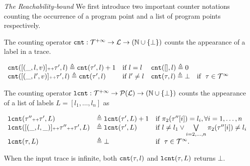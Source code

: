 \emph{The Reachability-bound}
We first introduce two important counter notations counting the occurrence of a program point and a list of program points respectively.
\begin{defn}
 \label{def:counter}
The counting operator $\mathtt{cnt} : \mathcal{T}^{+\infty} \to \mathcal{L} \to (\mathbb{N} \cup \{\bot\})$
counts the appearance of a label in a trace.
\begin{center}
{\small
$
\begin{array}{llll}
\mathtt{cnt}([(\_, l, v)] {\scriptscriptstyle ++} \mathtt{\tau}', l ) \triangleq \mathtt{cnt}(\mathtt{\tau}', l) + 1 & \text{if}~ l = l
&
\mathtt{cnt}({[]}, l) \triangleq 0 & 
\\
\mathtt{cnt}([(\_, l', v)] {\scriptscriptstyle ++} \mathtt{\tau}', l) \triangleq \mathtt{cnt}(\mathtt{\tau}', l) & \text{if}~ l' \neq l
&
\mathtt{cnt}(\mathtt{\tau}, l) \triangleq \bot & \text{if }~ \mathtt{\tau} \in \mathcal{T}^{\infty}
\end{array}
$
}
\end{center}
\end{defn}
\begin{defn}
 \label{def:lcounter}
 The counting operator $\mathtt{lcnt} : \mathcal{T}^{+\infty} \to \mathcal{P}(\mathcal{L}) \to (\mathbb{N} \cup \{\bot\})$
 counts the appearance of a list of labels $L = [l_1, \ldots, l_n]$ as
{\small
\begin{center}
 $
 \begin{array}{lll}
 \mathtt{lcnt}(\mathtt{\tau}'' {\scriptscriptstyle ++} \mathtt{\tau}', L ) 
 & \triangleq \mathtt{lcnt}(\mathtt{\tau}', L) + 1 & \text{if}~ \pi_2(\mathtt{\tau}''[i]) = l_i, \forall i = 1, \ldots, n
 \\ 
 \mathtt{lcnt}([(\_, l, \_)] {\scriptscriptstyle ++} \mathtt{\tau}'' {\scriptscriptstyle ++} \mathtt{\tau}', L ) 
 & \triangleq \mathtt{lcnt}(\mathtt{\tau}', L) & \text{if}~ l \neq l_1 \lor \bigvee\limits_{i = 2, \ldots, n} \pi_2(\mathtt{\tau}''[i]) \neq l_i
 \\ 
 \mathtt{lcnt}(\mathtt{\tau}, L ) 
 & \triangleq \bot & \text{if }~ \mathtt{\tau} \in \mathcal{T}^{\infty}.
 \end{array}
 $
 \end{center}
 }
\end{defn}
%
When the input trace is infinite, both $\mathtt{cnt}(\mathtt{\tau}, l)$ and $\mathtt{lcnt}(\mathtt{\tau}, L)$ returns $\bot$.

